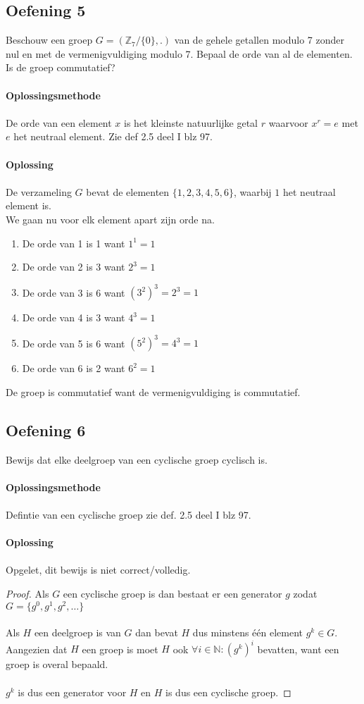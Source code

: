 \documentclass[11pt,a4paper,titlepage]{article}
\begin{document}
\subsection{Oefening 5}
Beschouw een groep $ G = (\mathbb{Z}_7/\{0\},.)$ van de gehele getallen modulo 7 zonder nul en met de vermenigvuldiging modulo 7. Bepaal de orde van al de elementen. Is de groep commutatief?
\\ \\ \textbf{Oplossingsmethode} \\ \\
De orde van een element $x$ is het kleinste natuurlijke getal $r$ waarvoor $x^r = e$ met $e$ het neutraal element. Zie def 2.5 deel I blz 97.
\\ \\ \textbf{Oplossing} \\ \\
De verzameling $G$ bevat de elementen $\{1,2,3,4,5,6\}$, waarbij $1$ het neutraal element is.\\ We gaan nu voor elk element apart zijn orde na.
\begin{enumerate}
	\item De orde van 1 is 1 want $1^1 = 1$
	\item De orde van 2 is 3 want $2^3 = 1$
	\item De orde van 3 is 6 want $(3^2)^3= 2^3 = 1$
	\item De orde van 4 is 3 want $4^3 =  1$
	\item De orde van 5 is 6 want $(5^2)^3 = 4^3 = 1$
	\item De orde van 6 is 2 want $6^2 = 1$
\end{enumerate}
De groep is commutatief want de vermenigvuldiging is commutatief.
\subsection{Oefening 6}
Bewijs dat elke deelgroep van een cyclische groep cyclisch is.
\\ \\ \textbf{Oplossingsmethode} \\ \\
Defintie van een cyclische groep zie def. 2.5 deel I blz 97.
\\ \\ \textbf{Oplossing} \\ \\
Opgelet, dit bewijs is niet correct/volledig.
\begin{proof}
Als $G$ een cyclische groep is dan bestaat er een generator $g$ zodat $G = \{g^0, g^1, g^2, \dots \}$\\ \\
Als $H$ een deelgroep is van $G$ dan bevat $H$ dus minstens één element $g^k \in G$. \\
Aangezien dat $H$ een groep is moet $H$ ook $\forall i \in \mathbb{N}: (g^k)^i$ bevatten, want een groep is overal bepaald.\\ \\
$g^k$ is dus een generator voor $H$ en $H$ is dus een cyclische groep.
\end{proof}
\newpage
\end{document}
